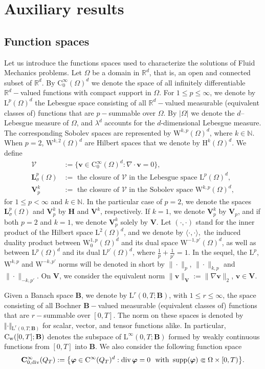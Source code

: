 \documentclass[12pt,reqno]{amsart}
\numberwithin{equation}{section}
\let\originalleft\left
\let\originalright\right
\renewcommand{\left}{\mathopen{}\mathclose\bgroup\originalleft}
\renewcommand{\right}{\aftergroup\egroup\originalright}
\theoremstyle{definition}
\def\1{\Omega}
\def\div{\operatorname{div}}
\def\supp{\operatorname{supp}}
\def\W{\mathrm{W}}
\def\R{\mathbb{R}}
\def\L{\mathrm{L}}
\def\HH{\mathrm{H}}
\def\vv{\boldsymbol{v}}
\def\C{\mathrm{C}}
\def\N{\mathbb{N}}
\def\bfB{\mathbf{B}}
\def\bfC{\mathbf{C}}
\def\bfH{\mathbf{H}}
\def\bfL{\mathbf{L}}
\def\bfV{\mathbf{V}}
\def\rw{\rm{w}}
\def\bfi{\boldsymbol{\varphi}}
\def\bVcal{\boldsymbol{\mathcal{V}}}
\begin{document}
\section{Auxiliary results}\label{sec2}
\subsection{Function spaces}
Let us  introduce the functions spaces used to characterize the solutions of Fluid Mechanics problems.	Let $\1$ be a domain in $\R^d$, that is,  an open and connected subset of $\R^d$.	
By $\C_0^{\infty}(\1)^d$ we  denote the space of all infinitely differentiable $\R^d-$valued functions with compact support in $\1$.	For $1\leq p\leq \infty$, we denote by $\L^p(\1)^d$ the Lebesgue space consisting of all $\R^d-$valued measurable (equivalent classes of) functions that are $p-$summable over $\1$.	
By $|\1|$ we denote the $d$--Lebesgue measure of $\1$, {and $\lambda^{d}$ accounts for the $d$-dimensional Lebesgue measure.}
The corresponding Sobolev spaces are represented by $\W^{k,p}(\1)^d$, where $k\in\N$.	
When $p=2$, $\W^{k,2}(\1)^d$ are Hilbert spaces that we denote by $\HH^k(\1)^d$.	We define
	\begin{align}
		\bVcal &:=\big\{\vv\in\C_0^{\infty}(\1)^d:\nabla\cdot \vv=0\big\}, \label{V-cal} \\
		\bfL_\sigma^p(\1)&:= \text{ the closure of }  \bVcal \text{ in the Lebesgue space } \L^p(\1)^d, \label{L-sig} \\
		\bfV_p^k&:= \text{ the closure of }  \bVcal \text{ in the Sobolev space } \W^{k,p}(\1)^d, \label{V-p:k}
	\end{align}
	for $1\leq p<\infty$ and $k\in\N$.
	In the particular case of $p=2$, we denote the spaces $\bfL_\sigma^p(\1)$ and $\bfV_p^k$ by $\bfH$ and $\bfV^k$, respectively.
If $k=1$, we denote $\bfV_p^k$ by $\bfV_p$, and if both $p=2$ and $k=1$, we denote $\bfV_p^k$ solely by $\bfV$.
	Let $(\cdot,\cdot)$ stand for the inner product of the Hilbert space $\L^2(\1)^d$, and we denote by $\langle \cdot,\cdot\rangle ,$ the induced duality product between $\W_0^{1,p}(\1)^d$  and its dual space $\W^{-1,p'}(\1)^d$, as well as between $\L^p(\1)^d$ and its dual $\L^{p'}(\1)^d$, where $\frac{1}{p}+\frac{1}{p'}=1$.
In the sequel, the $\L^p$, $\W^{k,p}$ and $\W^{-k,p'}$ norms will be denoted in short by $\|\cdot\|_p$, $\|\cdot\|_{k,p}$ and $\|\cdot\|_{-k,p'}$.
On $\bfV$, we consider the equivalent norm $\|\vv\|_{\bfV}:=\|\nabla\vv\|_{2}$, $\vv\in\bfV$.

Given a Banach space $\bfB$, we denote by $\L^r(0,T;\bfB)$, with $1\leq r\leq \infty$, {the} space consisting of all Bochner  $\bfB-$valued measurable (equivalent classes of) functions that are $r-$summable over $[0,T]$.
The norm on these spaces is denoted by $\Vert{}\cdot\Vert{}_{\L^r(0,T;\bfB)}$ for scalar, vector, and tensor functions alike.
In particular, $\C_{\rw}([0,T];\bfB)$ denotes the subspace of $\L^\infty(0,T;\bfB)$ formed by weakly continuous functions from $[0,T]$ into
$\bfB$.
We also consider the following function space
\begin{equation*}
\bfC^\infty_{0,\div}(Q_T):=\left\{\bfi\in \C^{\infty}(Q_T)^d : \div\bfi=0\ \text{ with } \supp(\bfi)\Subset\1\times[0,T)\right\}.
\end{equation*}
\end{document}
